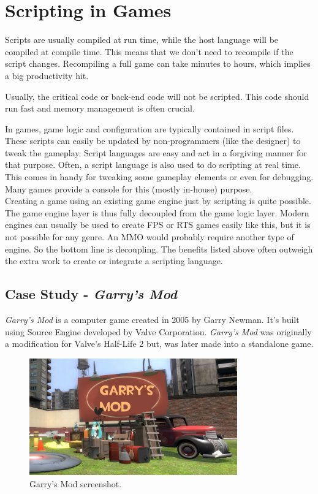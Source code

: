 \documentclass[12pt]{article}
\begin{document}
\section{Scripting in Games}
Scripts are usually compiled at run time, while the host language will be compiled at compile time. This means that we don't need to recompile if the script changes. Recompiling a full game can take minutes to hours, which implies a big productivity hit.

Usually, the critical code or back-end code will not be scripted. This code should run fast and memory management is often crucial.

In games, game logic and configuration are typically contained in script files. These scripts can easily be updated by non-programmers (like the designer) to tweak the gameplay. Script languages are easy and act in a forgiving manner for that purpose.
Often, a script language is also used to do scripting at real time. This comes in handy for tweaking some gameplay elements or even for debugging. Many games provide a console for this (mostly in-house) purpose.\\
 
Creating a game using an existing game engine just by scripting is quite possible. The game engine layer is thus fully decoupled from the game logic layer. Modern engines can usually be used to create FPS or RTS games easily like this, but it is not possible for any genre. An MMO would probably require another type of engine.
So the bottom line is decoupling. The benefits listed above often outweigh the extra work to create or integrate a scripting language.

\subsection{Case Study - \textit{Garry's Mod}}

\textit{Garry's Mod} is a computer game created in 2005 by Garry Newman. It's built using Source Engine developed by Valve Corporation. \textit{Garry's Mod} was originally a modification for Valve's Half-Life 2 but, was later made into a standalone game.

\begin{figure}[h!]
    \centering
    \includegraphics[width=0.8\textwidth]{garrys.jpg}
    \caption{Garry's Mod screenshot.}
    \label{fig:awesome_image}
\end{figure}
\end{document}
